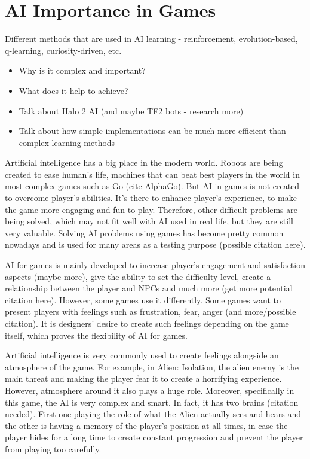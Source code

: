 \documentclass[journal]{IEEEtran}
\begin{document}
\section{AI Importance in Games}
Different methods that are used in AI learning - reinforcement, evolution-based, q-learning, curiosity-driven, etc. 
\begin{itemize}
	\item Why is it complex and important?
	\item What does it help to achieve? 
	\item Talk about Halo 2 AI (and maybe TF2 bots - research more)
	\item Talk about how simple implementations can be much more efficient than complex learning methods
\end{itemize}

Artificial intelligence has a big place in the modern world. Robots are being created to ease human's life, machines that can beat best players in the world in most complex games such as Go (cite AlphaGo). But AI in games is not created to overcome player's abilities. It's there to enhance player's experience, to make the game more engaging and fun to play. Therefore, other difficult problems are being solved, which may not fit well with AI used in real life, but they are still very valuable. Solving AI problems using games has become pretty common nowadays and is used for many areas as a testing purpose (possible citation here).

AI for games is mainly developed to increase player's engagement and satisfaction aspects (maybe more), give the ability to set the difficulty level, create a relationship between the player and NPCs and much more (get more potential citation here). However, some games use it differently. Some games want to present players with feelings such as frustration, fear, anger (and more/possible citation). It is designers' desire to create such feelings depending on the game itself, which proves the flexibility of AI for games.

Artificial intelligence is very commonly used to create feelings alongside an atmosphere of the game. For example, in Alien: Isolation, the alien enemy is the main threat and making the player fear it to create a horrifying experience. However, atmosphere around it also plays a huge role. Moreover, specifically in this game, the AI is very complex and smart. In fact, it has two brains (citation needed). First one playing the role of what the Alien actually sees and hears and the other is having a memory of the player's position at all times, in case the player hides for a long time to create constant progression and prevent the player from playing too carefully.
\end{document}
